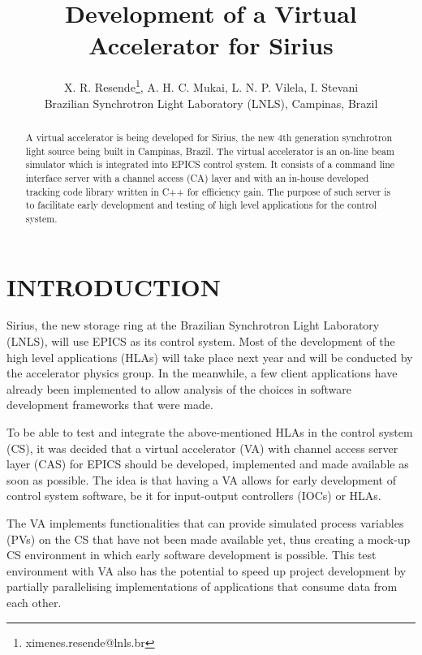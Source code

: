 \documentclass[a4paper,
              ]{jacow}
\begin{document}
\title{Development of a Virtual Accelerator for Sirius}
\author{X. R. Resende\thanks{ximenes.resende@lnls.br}, A. H. C. Mukai, L. N. P. Vilela, I. Stevani \\ Brazilian Synchrotron Light Laboratory (LNLS), Campinas, Brazil}
\maketitle

\begin{abstract}
A virtual accelerator is being developed for Sirius, the new 4th generation synchrotron light source being built in Campinas, Brazil\cite{sirius_status}.
The virtual accelerator is an on-line beam simulator which is integrated into EPICS control system.
It consists of a command line interface server with a channel access (CA) layer and with an in-house developed tracking code library written in C++ for efficiency gain.
The purpose of such server is to facilitate early development and testing of high level applications for the control system.
\end{abstract}

\section{INTRODUCTION}

Sirius, the new storage ring at the Brazilian Synchrotron Light Laboratory (LNLS), will use EPICS as its control system.
Most of the development of the high level applications (HLAs) will take place next year and will be conducted by the accelerator physics group.
In the meanwhile, a few client applications have already been implemented to allow analysis of the choices in software development frameworks\cite{sirius_hla} that were made.

To be able to test and integrate the above-mentioned HLAs in the control system (CS), it was decided that a virtual accelerator (VA) with channel access server layer (CAS) for EPICS should be developed, implemented and made available as soon as possible.
The idea is that having a VA allows for early development of control system software, be it for input-output controllers (IOCs) or HLAs.

The VA implements functionalities that can provide si\-mu\-la\-ted process variables (PVs) on the CS that have not been made available yet, thus creating a mock-up CS environment in which early software development is possible.
This test environment with VA also has the potential to speed up project development by partially parallelising implementations of applications that consume data from each other.
\end{document}
